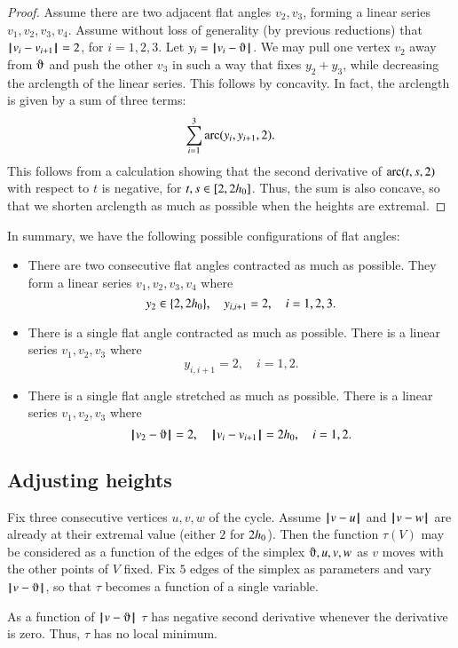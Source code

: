 \begin{proof}
Assume there are two adjacent flat angles $v_2,v_3$, forming a linear series $v_1,v_2,v_3,v_4$.
Assume without loss of generality (by previous reductions) that
${\hskip0.1em|\hskip-0.15em|\hskip0.1em}v_i - v_{i+1}{\hskip0.1em|\hskip-0.15em|\hskip0.1em}=2$, for $i=1,2,3$.
Let $y_i = \norm{v_i}{\orgn}$.
We may pull one vertex $v_2$ away from $\orgn$ and push the other $v_3$ in such a way that fixes $y_2+y_3$, while decreasing the arclength of the linear series.  This follows by concavity.
In fact, the arclength is given by a sum of three terms:
  $$
  \sum_{i=1}^3\operatorname{arc}(y_i,y_{i+1},2).
  $$
This follows from a calculation showing that the second derivative of $\operatorname{arc}(t,s,2)$ with respect to $t$ is negative, for $t,s\in[2,2{h_0}]$.  Thus, the
sum is also concave, so that we shorten arclength as much as possible when the heights are extremal.
\end{proof}

In summary, we have the following possible configurations of flat angles:
\begin{itemize}
\item There are two consecutive flat angles contracted as much as possible.  They form a linear series $v_1,v_2,v_3,v_4$ where
$$
y_2\in\{2,2{h_0}\},\quad
y_{i,i+1}=2,\quad i=1,2,3.
$$
\item There is a single flat angle contracted as much as possible.  There
is a linear series $v_1,v_2,v_3$ where
$$
y_{i,i+1}=2,\quad i=1,2.
$$
\item There is a single flat angle stretched as much as possible.  There
is a linear series $v_1,v_2,v_3$ where
$$
\norm{v_2}{\orgn}=2,\quad
\norm{v_i}{v_{i+1}}=2\hm,\quad i=1,2.
$$
\end{itemize}


\subsection{Adjusting heights}

Fix three consecutive vertices $u,v,w$ of the cycle.
Assume ${\hskip0.1em|\hskip-0.15em|\hskip0.1em}v - u{\hskip0.1em|\hskip-0.15em|\hskip0.1em}$ and ${\hskip0.1em|\hskip-0.15em|\hskip0.1em}v - w{\hskip0.1em|\hskip-0.15em|\hskip0.1em}$ are already at their extremal value (either $2$ for  $2{h_0}$).  Then the function $\tau(V)$ may be considered as a function
of the edges of the simplex $\orgn,u,v,w$ as $v$ moves with the other points of $V$ fixed.  Fix $5$ edges of the simplex as parameters and vary $\norm{v}{\orgn}$, so that $\tau$ becomes a function of a single variable.

\begin{lemma} As a function of $\norm{v}{\orgn}$
 $\tau$ has negative second derivative whenever the derivative is zero.  Thus, $\tau$ has no local minimum.
\end{lemma}

